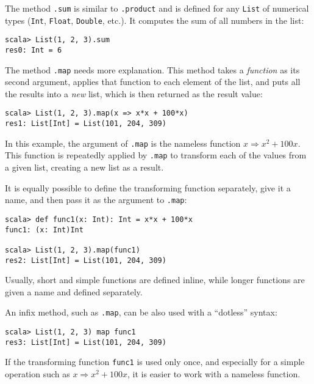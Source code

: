 The method \texttt{}\lstinline!.sum!
is similar to \lstinline!.product!
and is defined for any \lstinline!List!
of numerical types (\lstinline!Int!,
\lstinline!Float!, \lstinline!Double!,
etc.). It computes the sum of all numbers in the list:
\begin{lstlisting}
scala> List(1, 2, 3).sum
res0: Int = 6
\end{lstlisting}
The method \texttt{}\lstinline!.map!
needs more explanation. This method takes a \emph{function} as its
second argument, applies that function to each element of the list,
and puts all the results into a \emph{new }list, which is then returned
as the result value:

\begin{lstlisting}
scala> List(1, 2, 3).map(x => x*x + 100*x)
res1: List[Int] = List(101, 204, 309)
\end{lstlisting}
In this example, the argument of \lstinline!.map!
is the nameless function $x\Rightarrow x^{2}+100x$. This function
is repeatedly applied by \texttt{}\lstinline!.map!
to transform each of the values from a given list, creating a new
list as a result.

It is equally possible to define the transforming function separately,
give it a name, and then pass it as the argument to \lstinline!.map!:
\begin{lstlisting}
scala> def func1(x: Int): Int = x*x + 100*x
func1: (x: Int)Int 

scala> List(1, 2, 3).map(func1)
res2: List[Int] = List(101, 204, 309)
\end{lstlisting}
Usually, short and simple functions are defined inline, while longer
functions are given a name and defined separately.

An infix method, such as \lstinline!.map!,
can be also used with a ``dotless'' syntax:
\begin{lstlisting}
scala> List(1, 2, 3) map func1
res3: List[Int] = List(101, 204, 309)
\end{lstlisting}
If the transforming function \lstinline!func1!
is used only once, and especially for a simple operation such as $x\Rightarrow x^{2}+100x$,
it is easier to work with a nameless function.

